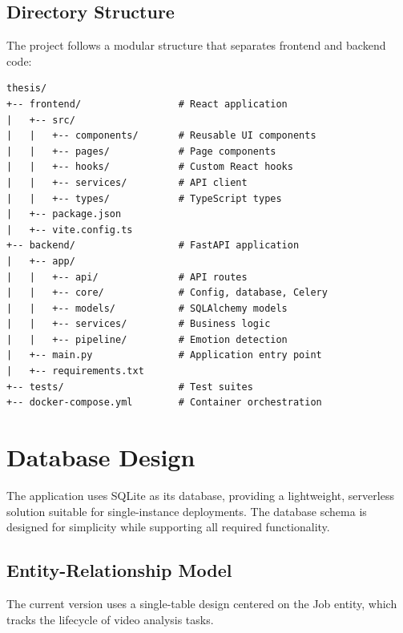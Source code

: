 \subsection{Directory Structure}

The project follows a modular structure that separates frontend and backend code:

\begin{verbatim}
thesis/
+-- frontend/                 # React application
|   +-- src/
|   |   +-- components/       # Reusable UI components
|   |   +-- pages/            # Page components
|   |   +-- hooks/            # Custom React hooks
|   |   +-- services/         # API client
|   |   +-- types/            # TypeScript types
|   +-- package.json
|   +-- vite.config.ts
+-- backend/                  # FastAPI application
|   +-- app/
|   |   +-- api/              # API routes
|   |   +-- core/             # Config, database, Celery
|   |   +-- models/           # SQLAlchemy models
|   |   +-- services/         # Business logic
|   |   +-- pipeline/         # Emotion detection
|   +-- main.py               # Application entry point
|   +-- requirements.txt
+-- tests/                    # Test suites
+-- docker-compose.yml        # Container orchestration
\end{verbatim}

\section{Database Design}
\label{sec:database-design}

The application uses SQLite as its database, providing a lightweight, serverless solution suitable for single-instance deployments. The database schema is designed for simplicity while supporting all required functionality.

\subsection{Entity-Relationship Model}

The current version uses a single-table design centered on the Job entity, which tracks the lifecycle of video analysis tasks.


